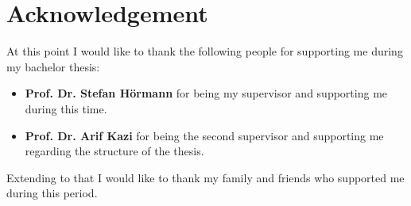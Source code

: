 \chapter*{Acknowledgement}
\label{acknowledgement}
At this point I would like to thank the following people for supporting me during my bachelor thesis:

\begin{itemize}
\item \textbf{Prof. Dr. Stefan Hörmann} for being my supervisor and supporting me during this time.
\item \textbf{Prof. Dr. Arif Kazi} for being the second supervisor and supporting me regarding the structure of the thesis.
\end{itemize}

Extending to that I would like to thank my family and friends who supported me during this period.


